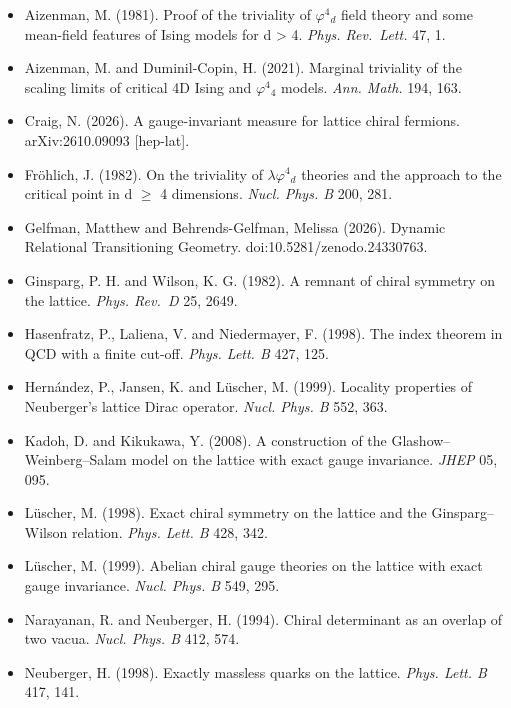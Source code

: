 \documentclass[
]{article}
\providecommand{\tightlist}{%
  \setlength{\itemsep}{0pt}\setlength{\parskip}{0pt}}
\begin{document}
\begin{itemize}
\tightlist
\item
  Aizenman, M. (1981). Proof of the triviality of \ensuremath{\varphi}\ensuremath{^{4}}\ensuremath{_{d}} field theory and
  some mean-field features of Ising models for d \textgreater{} 4.
  \emph{Phys. Rev.~Lett.} 47, 1.
\item
  Aizenman, M. and Duminil-Copin, H. (2021). Marginal triviality of the
  scaling limits of critical 4D Ising and \ensuremath{\varphi}\ensuremath{^{4}}\ensuremath{_{4}} models. \emph{Ann. Math.}
  194, 163.
\item
  Craig, N. (2026). A gauge-invariant measure for lattice chiral
  fermions. arXiv:2610.09093 {[}hep-lat{]}.
\item
  Fröhlich, J. (1982). On the triviality of \ensuremath{\lambda}\ensuremath{\varphi}\ensuremath{^{4}}\ensuremath{_{d}} theories and the
  approach to the critical point in d \ensuremath{\geq} 4 dimensions. \emph{Nucl. Phys.
  B} 200, 281.
\item
  Gelfman, Matthew and Behrends-Gelfman, Melissa (2026). Dynamic
  Relational Transitioning Geometry. doi:10.5281/zenodo.24330763.
\item
  Ginsparg, P. H. and Wilson, K. G. (1982). A remnant of chiral symmetry
  on the lattice. \emph{Phys. Rev.~D} 25, 2649.
\item
  Hasenfratz, P., Laliena, V. and Niedermayer, F. (1998). The index
  theorem in QCD with a finite cut-off. \emph{Phys. Lett. B} 427, 125.
\item
  Hernández, P., Jansen, K. and Lüscher, M. (1999). Locality properties
  of Neuberger's lattice Dirac operator. \emph{Nucl. Phys. B} 552, 363.
\item
  Kadoh, D. and Kikukawa, Y. (2008). A construction of the
  Glashow--Weinberg--Salam model on the lattice with exact gauge
  invariance. \emph{JHEP} 05, 095.
\item
  Lüscher, M. (1998). Exact chiral symmetry on the lattice and the
  Ginsparg--Wilson relation. \emph{Phys. Lett. B} 428, 342.
\item
  Lüscher, M. (1999). Abelian chiral gauge theories on the lattice with
  exact gauge invariance. \emph{Nucl. Phys. B} 549, 295.
\item
  Narayanan, R. and Neuberger, H. (1994). Chiral determinant as an
  overlap of two vacua. \emph{Nucl. Phys. B} 412, 574.
\item
  Neuberger, H. (1998). Exactly massless quarks on the lattice.
  \emph{Phys. Lett. B} 417, 141.

\end{itemize}
\end{document}
